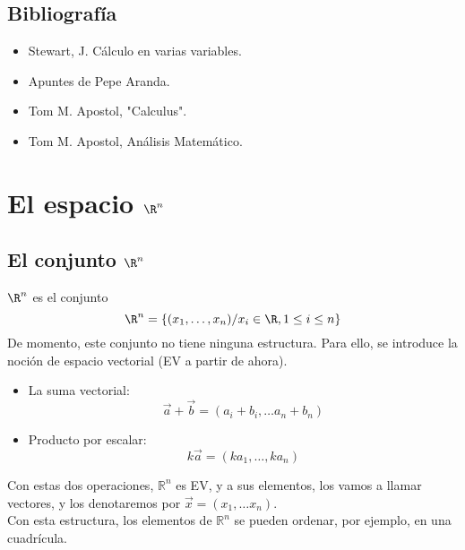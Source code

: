 \documentclass{../Calculo.tex}
\begin{document}
\section{Bibliografía}
\begin{itemize}
	\item Stewart, J. Cálculo en varias variables.
	\item Apuntes de Pepe Aranda.
	\item Tom M. Apostol, "Calculus".
	\item Tom M. Apostol, Análisis Matemático.
\end{itemize}
\pagebreak
\chapter{El espacio $\R^{n}$}
\section{El conjunto $\R^{n}$}
$\R^{n}$ es el conjunto
\[
		\R^{n} =\{ ( x_1,\dots ,x_{n}) / x_{i} \in \R, 1 \leq i \leq n\}
\]
De momento, este conjunto no tiene ninguna estructura. Para ello, se introduce
la noción de espacio vectorial (EV a partir de ahora).
\begin{itemize}
	\item La suma vectorial:
	\[
		\vec{a} + \vec{b} = (a_{i}+b_{i},\dots a_{n}+b_{n})	
	\]
	\item Producto por escalar:
		\[
			k \vec{a} = (ka_{1},\dots ,ka_{n})
		\]
\end{itemize}
Con estas dos operaciones, $\mathbb{R}^{n}$ es EV, y a sus elementos, los vamos a
llamar vectores, y los denotaremos por $\vec{x}=(x_{1},\dots x_{n})$.\\
Con esta estructura, los elementos de $\mathbb{R}^{n}$ se pueden ordenar, por
ejemplo, en una cuadrícula.
\begin{center}


\end{center}
\end{document}
